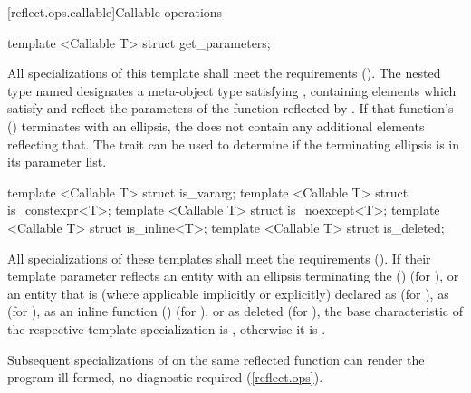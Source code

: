 [reflect.ops.callable]{Callable operations}
\begin{std.txt}\color{addclr}
\begin{itemdecl}
template <Callable T> struct get_parameters;
\end{itemdecl}
\begin{itemdescr}
\pnum
      All specializations of this template shall meet the  requirements (). The nested type named  designates a meta-object type satisfying , containing elements which satisfy  and reflect the parameters of the function reflected by .
      If that function's  () terminates with an ellipsis, the  does not contain any additional elements reflecting that. The  trait can be used to determine if the terminating ellipsis is in its parameter list.
\end{itemdescr}

\begin{itemdecl}
template <Callable T> struct is_vararg;
template <Callable T> struct is_constexpr<T>;
template <Callable T> struct is_noexcept<T>;
template <Callable T> struct is_inline<T>;
template <Callable T> struct is_deleted;
\end{itemdecl}
\begin{itemdescr}
\pnum
      All specializations of these templates shall meet the
       requirements ().  If their template
      parameter reflects an entity with an ellipsis terminating the
       () (for
      ), or an entity that is (where applicable implicitly or
      explicitly) declared as  (for ),
      as  (for ), as an inline function
      () (for ), or as deleted (for
      ), the base characteristic of the respective template
      specialization is , otherwise it is .

\pnum
\remarks
Subsequent specializations of  on the same reflected
function can render the program ill-formed, no diagnostic required
(\ref{reflect.ops}).
\end{itemdescr}
\end{std.txt}

